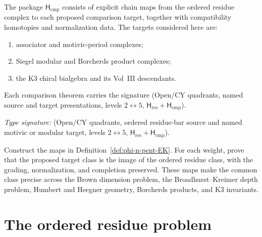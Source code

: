 \begin{definition}
\ClaimStatusDefinitional
\label{def:phi-n-pent-EK}
The package $\mathsf H_{\mathrm{cmp}}$ consists of explicit chain
maps from the ordered residue complex to each proposed comparison
target, together with compatibility homotopies and normalization
data.  The targets considered here are:

\begin{enumerate}[label=\textup{(\roman*)}]
\item associator and motivic-period complexes;
\item Siegel modular and Borcherds product complexes;
\item the K3 chiral bialgebra and its Vol~III descendants.
\end{enumerate}

Each comparison theorem carries the signature
\textup{(Open/CY quadrants, named source and target presentations,
levels \(2\leftrightarrow5\),
\(\mathsf H_{\mathrm{res}}+\mathsf H_{\mathrm{cmp}}\)).}
\end{definition}

\begin{problem}
\ClaimStatusOpen
\label{thm:phi-n-humbert-heegner-admissibility}
\label{thm:phi-n-weight-11-12-13}
\label{thm:phi-n-weight-13-14-15-16}
\label{thm:phi-n-weight-17-18-19-20}
\label{thm:phi-n-weight-21-24}
\label{thm:phi-n-weight-25-28}
\label{thm:phi-n-weight-29-32}
\label{thm:phi-n-weight-33-36}
\label{thm:phi-n-humbert-heegner-triple-27-29-35}
\label{thm:phi-n-humbert-heegner-triple-37-43-45}
\label{rem:three-filter-composite-scope}
\label{rem:shadtower-1}
\label{rem:shadtower-2}
\emph{Type signature:}
\textup{(Open/CY quadrants, ordered residue-bar source and named
motivic or modular target, levels \(2\leftrightarrow5\),
\(\mathsf H_{\mathrm{res}}+\mathsf H_{\mathrm{cmp}}\)).}

Construct the maps in Definition~\ref{def:phi-n-pent-EK}.  For each
weight, prove that the proposed target class is the image of the
ordered residue class, with the grading, normalization, and
completion preserved.  These maps make the common class precise
across the Brown dimension problem, the Broadhurst--Kreimer depth
problem, Humbert and Heegner geometry, Borcherds products, and K3
invariants.
\end{problem}

\section*{The ordered residue problem}

